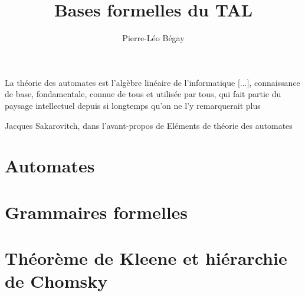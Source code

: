 \documentclass{report}
\title{Bases formelles du TAL}
\author{Pierre-Léo Bégay}
\theoremstyle{example}
\theoremstyle{example}
\theoremstyle{remark}
\begin{document}
\maketitle

\epigraph{La théorie des automates est l'algèbre linéaire de l'informatique [...], connaissance de base, fondamentale, connue de tous et utilisée par tous, qui fait partie du paysage intellectuel depuis si longtemps qu'on ne l'y remarquerait plus}{Jacques Sakarovitch, dans l'avant-propos de Eléments de théorie des automates}

\tableofcontents




\chapter{Automates}
\label{automates}

\chapter{Grammaires formelles}
\label{grammaires}

\chapter{Théorème de Kleene et hiérarchie de Chomsky}
\label{hierarchie}




\appendix


\end{document}
